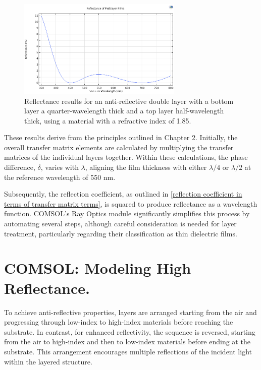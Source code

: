 \begin{figure}[H]
  \centering
  \includegraphics[width=0.7\textwidth]{Chapters/Figures/Chapter 4 Figures/Antireflective Figure c.png}
  \caption{Reflectance results for an anti-reflective double layer with a bottom layer a quarter-wavelength thick and a top layer half-wavelength thick, using a material with a refractive index of 1.85.}
  \label{fig:Antireflective Figure c}
\end{figure}

These results derive from the principles outlined in Chapter 2. Initially, the overall transfer matrix elements are calculated by multiplying the transfer matrices of the individual layers together. Within these calculations, the phase difference, $\delta$, varies with $\lambda$, aligning the film thickness with either $\lambda/4$ or $\lambda/2$ at the reference wavelength of 550 nm.

Subsequently, the reflection coefficient, as outlined in \ref{reflection coefficient in terms of transfer matrix terms}, is squared to produce reflectance as a wavelength function. COMSOL's Ray Optics module significantly simplifies this process by automating several steps, although careful consideration is needed for layer treatment, particularly regarding their classification as thin dielectric films.

\section{COMSOL: Modeling High Reflectance.}
To achieve anti-reflective properties, layers are arranged starting from the air and progressing through low-index to high-index materials before reaching the substrate. In contrast, for enhanced reflectivity, the sequence is reversed, starting from the air to high-index and then to low-index materials before ending at the substrate. This arrangement encourages multiple reflections of the incident light within the layered structure.

